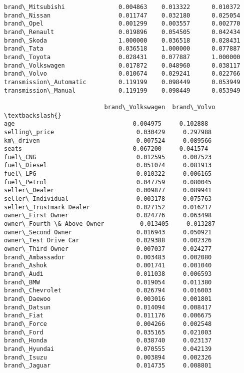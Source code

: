 \documentclass[11pt]{article}
\begin{document}
\begin{tcolorbox}[breakable, size=fbox, boxrule=.5pt, pad at break*=1mm, opacityfill=0]
\begin{Verbatim}[commandchars=\\\{\}]
brand\_Mitsubishi               0.004863    0.013322      0.010372
brand\_Nissan                   0.011747    0.032180      0.025054
brand\_Opel                     0.001299    0.003557      0.002770
brand\_Renault                  0.019896    0.054505      0.042434
brand\_Skoda                    1.000000    0.036518      0.028431
brand\_Tata                     0.036518    1.000000      0.077887
brand\_Toyota                   0.028431    0.077887      1.000000
brand\_Volkswagen               0.017872    0.048960      0.038117
brand\_Volvo                    0.010674    0.029241      0.022766
transmission\_Automatic         0.119199    0.098449      0.053949
transmission\_Manual            0.119199    0.098449      0.053949

                            brand\_Volkswagen  brand\_Volvo  \textbackslash{}
age                                 0.004975     0.102888
selling\_price                       0.030429     0.297988
km\_driven                           0.007524     0.089566
seats                               0.067200     0.041574
fuel\_CNG                            0.012595     0.007523
fuel\_Diesel                         0.051074     0.081913
fuel\_LPG                            0.010322     0.006165
fuel\_Petrol                         0.047759     0.080045
seller\_Dealer                       0.009877     0.089941
seller\_Individual                   0.003178     0.075763
seller\_Trustmark Dealer             0.027152     0.016217
owner\_First Owner                   0.024776     0.063498
owner\_Fourth \& Above Owner          0.013405     0.013287
owner\_Second Owner                  0.016943     0.050921
owner\_Test Drive Car                0.029388     0.002326
owner\_Third Owner                   0.007037     0.024277
brand\_Ambassador                    0.003483     0.002080
brand\_Ashok                         0.001741     0.001040
brand\_Audi                          0.011038     0.006593
brand\_BMW                           0.019054     0.011380
brand\_Chevrolet                     0.026794     0.016003
brand\_Daewoo                        0.003016     0.001801
brand\_Datsun                        0.014094     0.008417
brand\_Fiat                          0.011176     0.006675
brand\_Force                         0.004266     0.002548
brand\_Ford                          0.035165     0.021003
brand\_Honda                         0.038740     0.023137
brand\_Hyundai                       0.070555     0.042139
brand\_Isuzu                         0.003894     0.002326
brand\_Jaguar                        0.014735     0.008801

\end{Verbatim}
\end{tcolorbox}
\end{document}
